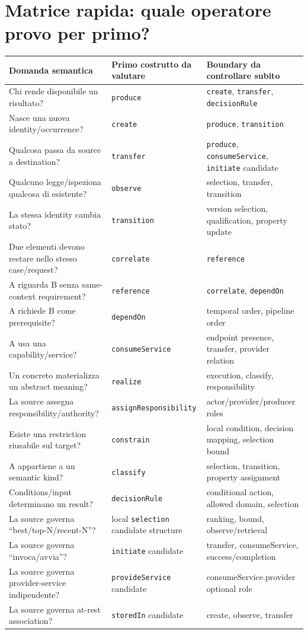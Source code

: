 \documentclass[11pt,a4paper]{article}
\begin{document}
\section{Matrice rapida: quale operatore provo per primo?}
\begin{longtable}{L{47mm}L{48mm}L{48mm}}
\toprule
\textbf{Domanda semantica} & \textbf{Primo costrutto da valutare} & \textbf{Boundary da controllare subito} \\
\midrule\endhead
Chi rende disponibile un risultato? & \texttt{produce} & \texttt{create}, \texttt{transfer}, \texttt{decisionRule} \\
Nasce una nuova identity/occurrence? & \texttt{create} & \texttt{produce}, \texttt{transition} \\
Qualcosa passa da source a destination? & \texttt{transfer} & \texttt{produce}, \texttt{consumeService}, \texttt{initiate} candidate \\
Qualcuno legge/ispeziona qualcosa di esistente? & \texttt{observe} & selection, transfer, transition \\
La stessa identity cambia stato? & \texttt{transition} & version selection, qualification, property update \\
Due elementi devono restare nello stesso case/request? & \texttt{correlate} & \texttt{reference} \\
A riguarda B senza same-context requirement? & \texttt{reference} & \texttt{correlate}, \texttt{dependOn} \\
A richiede B come prerequisite? & \texttt{dependOn} & temporal order, pipeline order \\
A usa una capability/service? & \texttt{consumeService} & endpoint presence, transfer, provider relation \\
Un concreto materializza un abstract meaning? & \texttt{realize} & execution, classify, responsibility \\
La source assegna responsibility/authority? & \texttt{assignResponsibility} & actor/provider/producer roles \\
Esiste una restriction riusabile sul target? & \texttt{constrain} & local condition, decision mapping, selection bound \\
A appartiene a un semantic kind? & \texttt{classify} & selection, transition, property assignment \\
Conditions/input determinano un result? & \texttt{decisionRule} & conditional action, allowed domain, selection \\
La source governa ``best/top-N/recent-N''? & local \texttt{selection} candidate structure & ranking, bound, observe/retrieval \\
La source governa ``invoca/avvia''? & \texttt{initiate} candidate & transfer, consumeService, success/completion \\
La source governa provider-service indipendente? & \texttt{provideService} candidate & consumeService.provider optional role \\
La source governa at-rest association? & \texttt{storedIn} candidate & create, observe, transfer \\
\bottomrule
\end{longtable}
\end{document}
